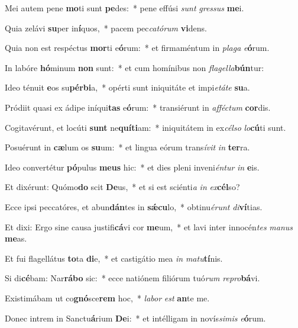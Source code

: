 \item Mei autem pene \textbf{mo}ti sunt \textbf{pe}des:~* pene effúsi \textit{sunt} \textit{gres}\textit{sus} \textbf{me}i.
\item Quia zelávi \textbf{su}per in\textbf{í}quos,~* pacem pec\textit{ca}\textit{tó}\textit{rum} \textbf{vi}dens.
\item Quia non est respéctus \textbf{mor}ti e\textbf{ó}rum:~* et firmaméntum in \textit{pla}\textit{ga} \textit{e}\textbf{ó}rum.
\item In labóre \textbf{hó}minum \textbf{non} sunt:~* et cum homínibus non \textit{fla}\textit{gel}\textit{la}\textbf{bún}tur:
\item Ideo ténuit \textbf{e}os su\textbf{pér}\textbf{bi}a,~* opérti sunt iniquitáte et impi\textit{e}\textit{tá}\textit{te} \textbf{su}a.
\item Pródiit quasi ex ádipe iníqui\textbf{tas} e\textbf{ó}rum:~* transiérunt in \textit{af}\textit{féc}\textit{tum} \textbf{cor}dis.
\item Cogitavérunt, et locúti \textbf{sunt} ne\textbf{quí}\textbf{ti}am:~* iniquitátem in ex\textit{cél}\textit{so} \textit{lo}\textbf{cú}ti sunt.
\item Posuérunt in \textbf{cæ}lum os \textbf{su}um:~* et lingua eórum trans\textit{í}\textit{vit} \textit{in} \textbf{ter}ra.
\item Ideo convertétur \textbf{pó}pulus \textbf{me}\textbf{us} hic:~* et dies pleni inveni\textit{én}\textit{tur} \textit{in} \textbf{e}is.
\item Et dixérunt: Quómo\textbf{do} scit \textbf{De}us,~* et si est sciénti\textit{a} \textit{in} \textit{ex}\textbf{cél}so?
\item Ecce ipsi peccatóres, et abun\textbf{dán}tes in \textbf{sǽ}\textbf{cu}lo,~* obtinu\textit{é}\textit{runt} \textit{di}\textbf{ví}tias.
\item Et dixi: Ergo sine causa justifi\textbf{cá}vi cor \textbf{me}um,~* et lavi inter innocén\textit{tes} \textit{ma}\textit{nus} \textbf{me}as.
\item Et fui flagellátus \textbf{to}ta \textbf{di}e,~* et castigátio mea \textit{in} \textit{ma}\textit{tu}\textbf{tí}nis.
\item Si di\textbf{cé}bam: Nar\textbf{rá}\textbf{bo} sic:~* ecce natiónem filiórum tuó\textit{rum} \textit{re}\textit{pro}\textbf{bá}vi.
\item Existimábam ut co\textbf{gnó}sce\textbf{rem} hoc,~* \textit{la}\textit{bor} \textit{est} \textbf{an}te me.
\item Donec intrem in Sanctu\textbf{á}rium \textbf{De}i:~* et intélligam in novís\textit{si}\textit{mis} \textit{e}\textbf{ó}rum.
